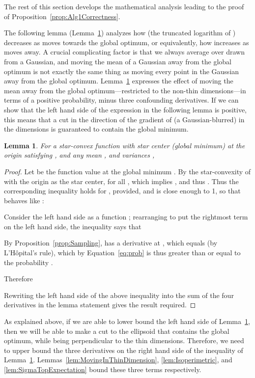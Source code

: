 \documentclass[11pt,letter]{article}
\newcounter{nTheorems}
\numberwithin{nTheorems}{section}
\newtheorem{lemma}[nTheorems]{Lemma}
\begin{document}
The rest of this section develops the mathematical analysis leading to the proof of Proposition~\ref{prop:Alg1Correctness}.


The following lemma (Lemma~\ref{lem:CutLB}) analyzes how  (the truncated logarithm of ) decreases as  moves towards the global optimum, or equivalently, how  increases as  moves away.
A crucial complicating factor is that we always average  over  drawn from a Gaussian, and moving the mean of a Gaussian away from the global optimum is not exactly the same thing as moving every point in the Gaussian away from the global optimum.
Lemma~\ref{lem:CutLB} expresses the effect of moving the mean away from the global optimum---restricted to the non-thin  dimensions---in terms of a positive probability, minus three confounding derivatives.
If we can show that the left hand side of the expression in the following lemma is positive, this means that a cut in the direction of the gradient of (a Gaussian-blurred)  in the  dimensions is guaranteed to contain the global minimum.
\begin{lemma}
\label{lem:CutLB}
For a star-convex function  with star center (global minimum) at the origin satisfying , and any mean , and variances ,

\end{lemma}

\begin{proof}
Let  be the function value at the global minimum . By the star-convexity of  with the origin as the star center,  for all , which implies , and thus . Thus the corresponding inequality holds for , provided,  and  is close enough to 1, so that  behaves like :


Consider the left hand side as a function ; rearranging to put the rightmost term on the left hand side, the inequality says that 

By Proposition~\ref{prop:Sampling},  has a derivative at , which equals  (by L'H\^{o}pital's rule), which by Equation~\ref{eq:prob} is thus greater than or equal to the probability .



Therefore

Rewriting the left hand side of the above inequality into the sum of the four derivatives in the lemma statement gives the result required.
\end{proof}

As explained above, if we are able to lower bound the left hand side of Lemma~\ref{lem:CutLB}, then we will be able to make a cut to the ellipsoid that contains the global optimum, while being perpendicular to the thin dimensions.
Therefore, we need to upper bound the three derivatives on the right hand side of the inequality of Lemma~\ref{lem:CutLB}.
Lemmas~\ref{lem:MovingInThinDimension}, \ref{lem:Isoperimetric}, and \ref{lem:SigmaTopExpectation} bound these three terms respectively.
\end{document}

